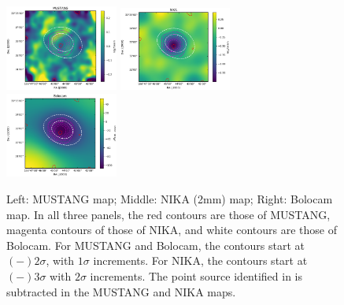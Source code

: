 \documentclass[twocolumn,traditabstract]{aa}
\begin{document}
\begin{figure}[!h]
  \centering
  \includegraphics[width=0.33\textwidth]{NIKA_ml_deproj_figs/MUSTANG_image_and_SNR_contours_cbar.eps}
  \includegraphics[width=0.33\textwidth]{NIKA_ml_deproj_figs/NIKA_image_and_SNR_contours_cbar.eps}
  \includegraphics[width=0.33\textwidth]{NIKA_ml_deproj_figs/BOLOCAM_image_and_SNR_contours_cbar.eps}
  \caption{Left: MUSTANG map; Middle: NIKA (2mm) map; Right: Bolocam map. In all three panels, the red contours are those
    of MUSTANG, magenta contours of those of NIKA, and white contours are those of Bolocam. For MUSTANG and Bolocam, the contours
    start at $(-)2\sigma$, with $1\sigma$ increments. For NIKA, the contours start at $(-)3\sigma$ with $2\sigma$ increments.
    The point source identified in \citet{adam2015} is subtracted in the MUSTANG
    and NIKA maps.}
  \label{fig:clj1227_maps}
\end{figure}




\end{document}

